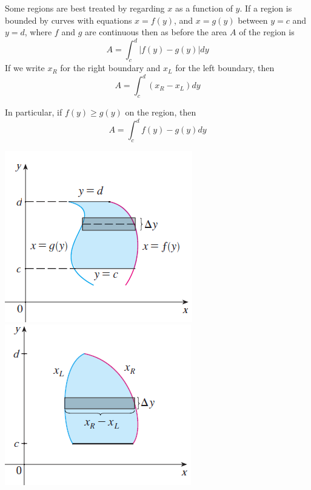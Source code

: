 \begin{frame}
Some regions are best treated by regarding $x$ as a function of $y$. If a region is bounded by curves with equations $ x=f(y) $, and $ x=g(y) $ between $ y=c $ and $ y=d $, where $ f $ and $ g $ are continuous then as before the area $ A $ of the region is  
\[
A=\int_c^d |f(y)-g(y)| dy
\]
If we write $ x_R $ for the right boundary and $ x_L $ for the left boundary, then \[ A=\int_c^d(x_R-x_L)dy \]

In particular, if $ f(y)\ge g(y) $ on the region, then 
\[
A=\int_c^d f(y)-g(y)dy
\]


\vspace*{-1cm}
\includegraphics[width=0.3\linewidth]{../../modules/area-between-curves/pictures/H1.PNG}\hfill
\includegraphics[width=0.3\linewidth]{../../modules/area-between-curves/pictures/H2.PNG}\\




\end{frame}


